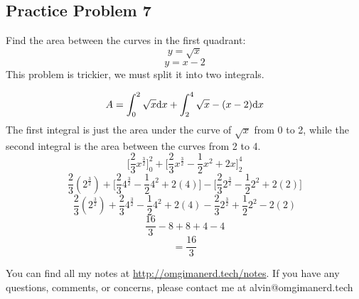 \documentclass[letterpaper, 12pt]{math}
\begin{document}
\subsection*{Practice Problem 7}
Find the area between the curves in the first quadrant:
\[ y = \sqrt{x} \]
\[ y = x-2 \]
This problem is trickier, we must split it into two integrals.
\begin{center}
\end{center}
\[ A = \int_{0}^{2}{\sqrt{x}\mathrm{d}{x}}+\int_{2}^{4}{\sqrt{x}-(x-2)\mathrm{d}{x}} \]
The first integral is just the area under the curve of \( \sqrt{x} \) from 0 to
2, while the second integral is the area between the curves from 2 to 4.
\[ \bigg[\frac{2}{3}x^{\frac{3}{2}}\bigg]_{0}^{2}+
   \bigg[\frac{2}{3}x^{\frac{3}{2}}-\frac{1}{2}x^{2}+2x\bigg]_{2}^{4} \]
\[ \frac{2}{3}(2^{\frac{3}{2}})+
   \bigg[\frac{2}{3}4^{\frac{3}{2}}-\frac{1}{2}4^{2}+2(4)\bigg]-
   \bigg[\frac{2}{3}2^{\frac{3}{2}}-\frac{1}{2}2^{2}+2(2)\bigg] \]
\[ \frac{2}{3}(2^{\frac{3}{2}})+
   \frac{2}{3}4^{\frac{3}{2}}-\frac{1}{2}4^{2}+2(4)-
   \frac{2}{3}2^{\frac{3}{2}}+\frac{1}{2}2^{2}-2(2) \]
\[ \frac{16}{3}-8+8+4-4 \]
\[  = \frac{16}{3} \]

\begin{center}
  You can find all my notes at \url{http://omgimanerd.tech/notes}. If you have
  any questions, comments, or concerns, please contact me at
  alvin@omgimanerd.tech
\end{center}
\end{document}
